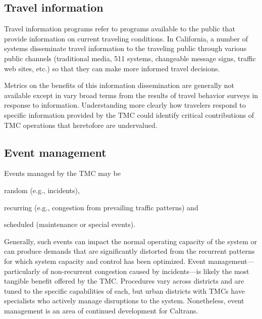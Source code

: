 \documentclass[12pt]{report}
\begin{document}
\subsection{Travel information}
\label{sec:trav-info}

Travel information programs refer to programs available to the public
that provide information on current traveling conditions. In
California, a number of systems disseminate travel information to the
traveling public through various public channels (traditional media,
511 systems, changeable message signs, traffic web sites, etc.) so
that they can make more informed travel decisions.

Metrics on the benefits of this information dissemination are
generally not available except in vary broad terms from the results of
travel behavior surveys in response to information. Understanding more
clearly how travelers respond to specific information provided by the
\ac{TMC} could identify critical contributions of \ac{TMC} operations that
heretofore are undervalued.

\subsection{Event management}
\label{sec:event-man}

Events managed by the \ac{TMC} may be
\begin{inparaenum}[(1)]
\item random (e.g., incidents),
\item recurring (e.g., congestion from prevailing traffic patterns)
  and
\item scheduled (maintenance or special events).
\end{inparaenum}
Generally, such events can impact the normal operating capacity of the
system or can produce demands that are significantly distorted from
the recurrent patterns for which system capacity and control has been
optimized.  Event management---particularly of non-recurrent
congestion caused by incidents---is likely the most tangible benefit
offered by the \ac{TMC}. Procedures vary across districts and are
tuned to the specific capabilities of each, but urban districts with
\acp{TMC} have specialists who actively manage disruptions to the
system. Nonetheless, event management is an area of continued
development for Caltrans.
\end{document}
